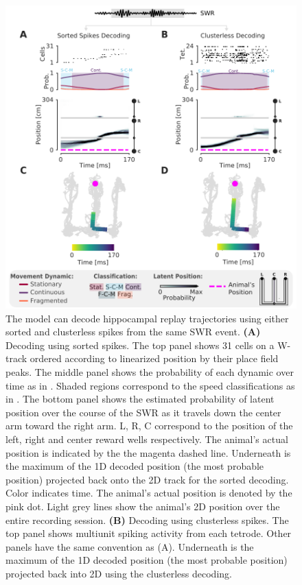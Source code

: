 \documentclass[9pt,lineno]{elife}
\providecommand{\DIFadd}[1]{{\protect\color{blue}\uwave{#1}}} %
\providecommand{\DIFdel}[1]{{\protect\color{red}\sout{#1}}}                      %
\providecommand{\DIFaddFL}[1]{\DIFadd{#1}} %
\providecommand{\DIFdelFL}[1]{\DIFdel{#1}} %
\providecommand{\DIFaddbeginFL}{} %
\providecommand{\DIFaddendFL}{} %
\providecommand{\DIFdelbeginFL}{} %
\providecommand{\DIFdelendFL}{} %
\newcommand{\DIFscaledelfig}{0.5}
\newlength{\DIFdelgraphicswidth} %
\newlength{\DIFdelgraphicsheight} %
\newcommand{\DIFaddincludegraphics}[2][]{{\color{blue}\fbox{\DIFOincludegraphics[#1]{#2}}}} %
\newcommand{\DIFdelincludegraphics}[2][]{%
\sbox{\DIFdelgraphicsbox}{\DIFOincludegraphics[#1]{#2}}%
\settoboxwidth{\DIFdelgraphicswidth}{\DIFdelgraphicsbox} %
\settoboxtotalheight{\DIFdelgraphicsheight}{\DIFdelgraphicsbox} %
\scalebox{\DIFscaledelfig}{%
\parbox[b]{\DIFdelgraphicswidth}{\usebox{\DIFdelgraphicsbox}\\[-\baselineskip] \rule{\DIFdelgraphicswidth}{0em}}\llap{\resizebox{\DIFdelgraphicswidth}{\DIFdelgraphicsheight}{%
\setlength{\unitlength}{\DIFdelgraphicswidth}%
\begin{picture}(1,1)%
\thicklines\linethickness{2pt} %
{\color[rgb]{1,0,0}\put(0,0){\framebox(1,1){}}}%
{\color[rgb]{1,0,0}\put(0,0){\line( 1,1){1}}}%
{\color[rgb]{1,0,0}\put(0,1){\line(1,-1){1}}}%
\end{picture}%
}\hspace*{3pt}}} %
} %
\DeclareRobustCommand{\DIFaddbeginFL}{\DIFOaddbeginFL \let\includegraphics\DIFaddincludegraphics} %
\DeclareRobustCommand{\DIFaddendFL}{\DIFOaddendFL \let\includegraphics\DIFOincludegraphics} %
\DeclareRobustCommand{\DIFdelbeginFL}{\DIFOdelbeginFL \let\includegraphics\DIFdelincludegraphics} %
\DeclareRobustCommand{\DIFdelendFL}{\DIFOaddendFL \let\includegraphics\DIFOincludegraphics} %
\begin{document}
\begin{figure}
\includegraphics[width=1.0\linewidth]{figures/Figure2/Figure2_v5}
\caption{The model can decode hippocampal replay trajectories using either sorted and clusterless spikes from the same SWR event. \textbf{(A)} Decoding using sorted spikes. The top panel shows 31 cells on a W-track ordered according to linearized position by their place field peaks. The middle panel shows the probability of each dynamic over time as in \FIG{1}\DIFdelbeginFL \DIFdelFL{F}\DIFdelendFL \DIFaddbeginFL \DIFaddFL{E, left panel}\DIFaddendFL . Shaded regions correspond to the speed classifications as in \FIG{1}\DIFdelbeginFL \DIFdelFL{G}\DIFdelendFL \DIFaddbeginFL \DIFaddFL{F}\DIFaddendFL . The bottom panel shows the estimated probability of latent position over the course of the SWR as it travels down the center arm toward the right arm. L, R, C correspond to the position of the left, right and center reward wells respectively. The animal's actual position is indicated by the the magenta dashed line. Underneath is the maximum of the 1D decoded position (the most probable position) projected back onto the 2D track for the sorted decoding. Color indicates time. The animal's actual position is denoted by the pink dot. Light grey lines show the animal's 2D position over the entire recording session. \textbf{(B)} Decoding using clusterless spikes. The top panel shows multiunit spiking activity from each tetrode. Other panels have the same convention as (A). Underneath is the maximum of the 1D decoded position (the most probable position) projected back into 2D using the clusterless decoding.
}
\label{fig:2}


\end{figure}
\end{document}
